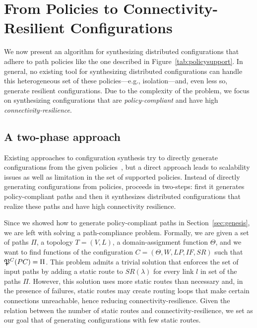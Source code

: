 \section{From Policies to Connectivity-Resilient  Configurations}
\label{sec:config-synthesis}

We now present an algorithm
for synthesizing distributed configurations
that adhere to path policies like the one described 
in Figure~\ref{tab:policysupport}.
In general, no existing tool for synthesizing 
distributed configurations
can handle this heterogeneous set of 
these policies---e.g., isolation---and, even less so,
generate resilient configurations.
Due to the complexity of the problem, we focus on 
synthesizing  configurations that 
are \emph{policy-compliant} and have high \emph{connectivity-resilience}.



\subsection{A two-phase approach}
Existing approaches to configuration synthesis
try to directly generate configurations from the given policies~\cite{synet},
but a direct approach leads to scalability issues as well as limitation
in the set of supported policies.
Instead of directly generating configurations from policies, 
\name proceeds in two-steps:
first it generates policy-compliant paths
and then it synthesizes distributed configurations that realize these paths
and have high connectivity resilience.

Since we showed how to generate policy-compliant paths in Section~\ref{sec:genesis},
we are left with solving a path-compliance problem.
Formally, we are given a set of paths $\Pi$,
a topology $T=(V,L)$,
a domain-assignment function $\Theta$, 
and we want to find functions of the configuration
$C=(\Theta,W,LP,IF,SR)$ such that
$\mathfrak{P}^C(PC) = \Pi$.
This problem admits a trivial solution that 
enforces the set of input paths
 by adding a 
static route to $SR(\lambda)$ for every link $l$ in 
set of the paths $\Pi$. 
However, this solution uses more static routes than necessary
and, in the presence of failures, static routes may
create routing loops that make certain connections 
unreachable, hence reducing connectivity-resilience.
Given the relation between the number of static 
routes and connectivity-resilience,
we set as our goal that of generating configurations 
with few static routes.

